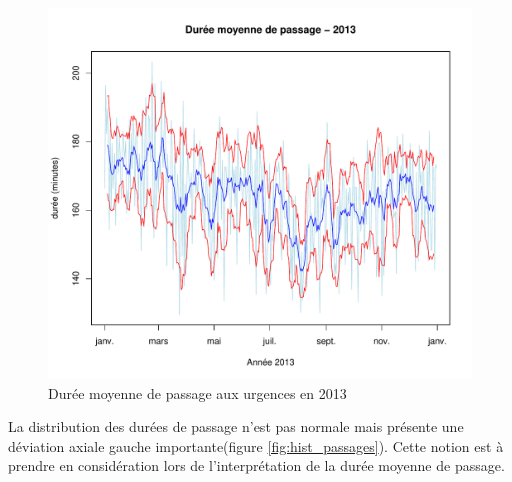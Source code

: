 \documentclass[12pt,english,french,twoside]{book}\usepackage[]{graphicx}\usepackage[]{color}
\makeatletter
\def\maxwidth{ %
  \ifdim\Gin@nat@width>\linewidth
    \linewidth
  \else
    \Gin@nat@width
  \fi
}
\newenvironment{knitrout}{}{} %
\makeatother
\begin{document}
\begin{figure}[ht!]
 \centering
\begin{knitrout}
\color{fgcolor}
\includegraphics[width=\maxwidth]{figure/graphe_duree_moyenne_passage} 

\end{knitrout}

 \caption{Durée moyenne de passage aux urgences en 2013}
\end{figure}





La distribution des durées de passage n'est pas normale mais présente une déviation axiale gauche importante(figure \ref{fig:hist_passages}). Cette notion est à prendre en considération lors de l'interprétation de la durée moyenne de passage.
\end{document}
